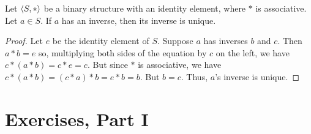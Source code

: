 \begin{thm}\label{uniqueinverse} Let $\langle S, *\rangle$ be a binary structure with an identity element, where $*$ is associative. Let $a\in S$. If $a$ has an inverse, then its inverse is unique.
\end{thm}

\begin{proof} Let $e$ be the identity element of $S$.  Suppose $a$ has inverses $b$ and $c$.  Then $a*b=e$ so, multiplying both sides of the equation by $c$ on the left, we have $c*(a*b)=c*e=c$.  But since $*$ is associative, we have $c*(a*b)=(c*a)*b=e*b=b$.  But $b=c$.  Thus, $a$'s inverse is unique.\end{proof}

\pagebreak
\section{Exercises, Part I}

